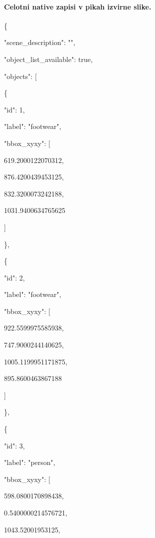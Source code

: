 \documentclass[10pt,a4paper]{article}
\begin{document}
\paragraph{Celotni native zapisi v pikah izvirne slike.}
\{\par
  "scene\_description":\allowbreak{} "",\allowbreak{}\par
  "object\_list\_available":\allowbreak{} true,\allowbreak{}\par
  "objects":\allowbreak{} [\par
    \{\par
      "id":\allowbreak{} 1,\allowbreak{}\par
      "label":\allowbreak{} "footwear",\allowbreak{}\par
      "bbox\_xyxy":\allowbreak{} [\par
        619.2000122070312,\allowbreak{}\par
        876.4200439453125,\allowbreak{}\par
        832.3200073242188,\allowbreak{}\par
        1031.9400634765625\par
      ]\par
    \},\allowbreak{}\par
    \{\par
      "id":\allowbreak{} 2,\allowbreak{}\par
      "label":\allowbreak{} "footwear",\allowbreak{}\par
      "bbox\_xyxy":\allowbreak{} [\par
        922.5599975585938,\allowbreak{}\par
        747.9000244140625,\allowbreak{}\par
        1005.1199951171875,\allowbreak{}\par
        895.8600463867188\par
      ]\par
    \},\allowbreak{}\par
    \{\par
      "id":\allowbreak{} 3,\allowbreak{}\par
      "label":\allowbreak{} "person",\allowbreak{}\par
      "bbox\_xyxy":\allowbreak{} [\par
        598.0800170898438,\allowbreak{}\par
        0.5400000214576721,\allowbreak{}\par
        1043.52001953125,\allowbreak{}\par
\end{document}
